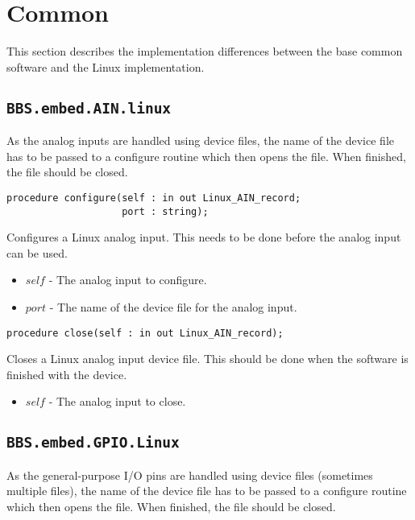 \documentclass[10pt, openany]{book}
\newcommand{\indexfunc}[1]{\index[func]{#1}}
\newcommand{\package}[1]{\texttt{#1}}
\begin{document}
\section{Common}
This section describes the implementation differences between the base common software and the Linux implementation.

\subsection{\package{BBS.embed.AIN.linux}}
As the analog inputs are handled using device files, the name of the device file has to be passed to a configure routine which then opens the file.  When finished, the file should be closed.

\begin{lstlisting}
procedure configure(self : in out Linux_AIN_record;
                    port : string);
\end{lstlisting}
\indexfunc{configure}
Configures a Linux analog input.  This needs to be done before the analog input can be used.
\begin{itemize}
  \item $self$ - The analog input to configure.
  \item $port$ - The name of the device file for the analog input.
\end{itemize}

\begin{lstlisting}
procedure close(self : in out Linux_AIN_record);
\end{lstlisting}
\indexfunc{close}
Closes a Linux analog input device file.  This should be done when the software is finished with the device.
\begin{itemize}
  \item $self$ - The analog input to close.
\end{itemize}

\subsection{\package{BBS.embed.GPIO.Linux}}
As the general-purpose I/O pins are handled using device files (sometimes multiple files), the name of the device file has to be passed to a configure routine which then opens the file.  When finished, the file should be closed.
\end{document}
